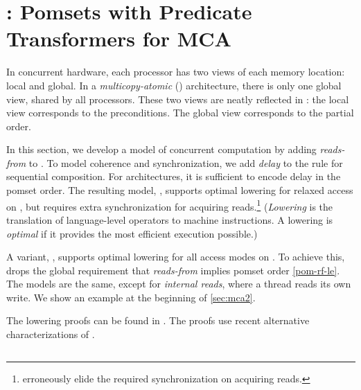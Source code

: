 \section{\PwTmcaTITLE{}: Pomsets with Predicate Transformers for MCA}
\label{sec:mca}

In concurrent hardware, each processor has two views of each memory location:
local and global.  In a \emph{multicopy-atomic} (\mca{}) architecture, there
is only one global view, shared by all processors.  These two views are
neatly reflected in \PwT{}: the local view corresponds to the preconditions.
The global view corresponds to the partial order.

In this section, we develop a model of concurrent computation by adding
\emph{reads-from} to .  To model coherence and
synchronization, we add \emph{delay} to the rule for sequential composition.
For \mca{} architectures, it is sufficient to encode delay in the pomset
order.  The resulting model, , supports optimal lowering for
relaxed access on \armeight{}, but requires extra synchronization for
acquiring reads.\footnote{\citet{DBLP:journals/pacmpl/JagadeesanJR20}
  erroneously elide the required synchronization on acquiring reads.}
(\emph{Lowering} is the translation of language-level operators to machine
instructions.  A lowering is \emph{optimal} if it provides the most efficient
execution possible.)

A variant, , supports optimal lowering for all access modes on
\armeight{}.  To achieve this,  drops the global requirement that
\emph{reads-from} implies pomset order \eqref{pom-rf-le}.  The models are the
same, except for \emph{internal reads}, where a thread reads its own write.
We show an example at the beginning of \textsection\ref{sec:mca2}.

The lowering proofs can be found in \cite{appendix}.  The proofs
use recent alternative characterizations of \armeight{} \cite{armed}.

\subsection{}
\label{sec:mca1}

